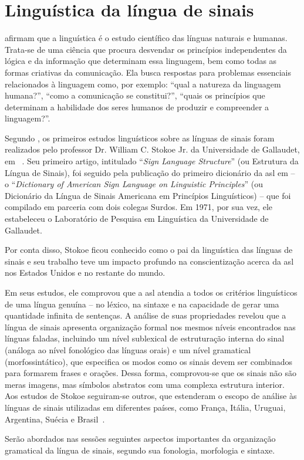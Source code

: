\section{Linguística da língua de sinais}
\label{sec:linguistica}

 afirmam que a linguística é o estudo científico das línguas naturais e humanas. Trata-se de uma ciência que procura desvendar os princípios independentes da lógica e da informação que determinam essa linguagem, bem como todas as formas criativas da comunicação.
Ela busca respostas para problemas essenciais relacionados à linguagem como, por exemplo: ``qual a natureza da linguagem humana?'',  ``como a comunicação se constitui?'', ``quais os princípios que determinam a habilidade dos seres humanos de produzir e compreender a linguagem?''.


Segundo , os primeiros estudos linguísticos sobre as línguas de sinais foram realizados pelo professor Dr. William C. Stokoe Jr. da Universidade de Gallaudet, em ~\citeyear{stokoe-1960-sl-structure}. 
Seu primeiro artigo, intitulado ``\textit{Sign Language Structure}'' (ou Estrutura da Língua de Sinais), foi seguido pela publicação do primeiro dicionário da \acrfull{asl} em \citeyear{stokoe-1965-dictionary-asl} -- o ``\textit{Dictionary of American Sign Language on Linguistic Principles}'' (ou Dicionário da Língua de Sinais Americana em Princípios Linguísticos) -- que foi compilado em parceria com dois colegas Surdos. Em 1971, por sua vez, ele estabeleceu o Laboratório de Pesquisa em Linguística da Universidade de Gallaudet.

Por conta disso, Stokoe ficou conhecido como o pai da linguística das línguas de sinais e seu trabalho teve um impacto profundo na conscientização acerca da \acrshort{asl} nos Estados Unidos e no restante do mundo.

Em seus estudos, ele comprovou que a \acrshort{asl} atendia a todos os critérios linguísticos de uma língua genuína -- no léxico, na sintaxe e na capacidade de  gerar uma quantidade infinita de sentenças.
A análise de suas propriedades revelou que a língua de sinais apresenta organização formal nos mesmos níveis encontrados nas línguas faladas, incluindo um nível sublexical de estruturação interna do sinal (análoga ao nível fonológico das línguas orais) e um nível gramatical (morfossintático), que especifica os modos como os sinais devem ser combinados para formarem frases e orações. Dessa forma, comprovou-se que os sinais não são meras imagens, mas símbolos abstratos com uma complexa estrutura interior. Aos estudos de Stokoe seguiram-se outros, que estenderam o escopo de análise às línguas de sinais utilizadas em diferentes países, como França, Itália, Uruguai, Argentina, Suécia e Brasil~\cite{stokoe-1960-sl-structure,quadros-2004-estudos-linguisticos, pereira-2011-conhecimento-alem-sinais}.

Serão abordados nas sessões seguintes aspectos importantes da organização gramatical da língua de sinais, segundo sua fonologia, morfologia e sintaxe.

